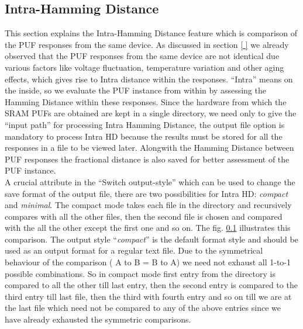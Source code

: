 \subsection{Intra-Hamming Distance}

This section explains the Intra-Hamming Distance feature which is comparison of the PUF responses from the same device. As discussed in section \ref{ } we already observed that the PUF responses from the same device are not identical due various factors like voltage fluctuation,  temperature variation and other aging effects, which gives rise to Intra distance within the responses. ``Intra'' means on the inside, so we evaluate the PUF instance from within by assessing the Hamming Distance within
these responses. Since the hardware from which the SRAM PUFs are obtained are kept in a single directory, we need only to give the ``input path'' for processing Intra Hamming Distance, the output file option is mandatory to process Intra HD because the results must be stored for all the responses in a file to be viewed later. Alongwith the Hamming Distance between PUF responses the fractional distance is also saved for better assessment of the PUF instance.\\

A crucial attribute in the ``Switch output-style'' which can be used to change the save format of the output file, there are two possibilities for Intra HD: \emph{compact} and \emph{minimal}. The compact mode takes each file in the directory and recursively compares with all the other files, then the second file is chosen and compared with the all the other except the first one and so on. The fig. \ref{} illustrates this comparison.  The output style ``\emph{compact}'' is the default format style and should be used
as an output format for a regular text file. Due to the symmetrical behaviour of the comparison ( A to B = B to A) we need not exhaust all 1-to-1 possible combinations. So in compact mode first entry from the directory is compared to all the other till last entry, then the second entry is compared to the third entry till last file, then the third with fourth entry and so on till we are at the last file which need not be compared to any of the above entries since we have already exhausted the
symmetric comparisons.\\


